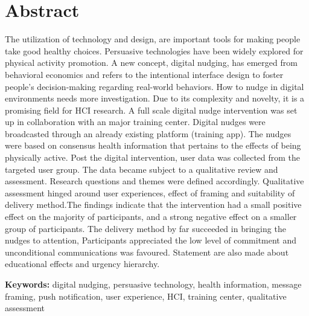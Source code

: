 \chapter*{Abstract}
The utilization of technology and design, are important tools for making people take good healthy choices. Persuasive technologies have been widely explored for physical activity promotion. A new concept, digital nudging, has emerged from behavioral economics and refers to the intentional interface design to foster people's decision-making regarding real-world behaviors. How to nudge in digital environments needs more investigation. Due to its complexity and novelty, it is a promising field for HCI research. A full scale digital nudge intervention was set up in collaboration with an major training center. Digital nudges were broadcasted through an already existing platform (training app). The nudges were based on consensus health information that pertains to the effects of being physically active. Post the digital intervention, user data was collected from the targeted user group. The data became subject to a qualitative review and assessment. Research questions and themes were defined accordingly. Qualitative assessment hinged around user experiences, effect of framing and suitability of delivery method.The findings indicate that the intervention had a small positive effect on the majority of participants, and a strong negative effect on a smaller group of participants. The delivery method by far succeeded in bringing the nudges to attention, Participants appreciated the low level of commitment and unconditional communications was favoured. Statement are also made about educational effects and urgency hierarchy. 

\textbf{Keywords:} digital nudging, persuasive technology, health information, message framing, push notification, user experience, HCI, training center, qualitative assessment